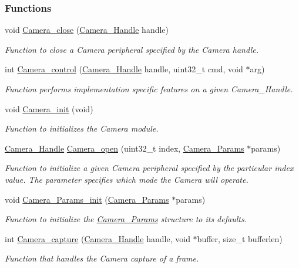 \subsubsection*{Functions}
\begin{DoxyCompactItemize}
\item 
void \hyperlink{_camera_8h_a132c638e5ea994c1f06124f5762470b4}{Camera\+\_\+close} (\hyperlink{_camera_8h_a68ce39c29bb7acaf6a7180bb6d6a7d06}{Camera\+\_\+\+Handle} handle)
\begin{DoxyCompactList}\small\item\em Function to close a Camera peripheral specified by the Camera handle. \end{DoxyCompactList}\item 
int \hyperlink{_camera_8h_adfc7e9a60daa499220296a238a09b393}{Camera\+\_\+control} (\hyperlink{_camera_8h_a68ce39c29bb7acaf6a7180bb6d6a7d06}{Camera\+\_\+\+Handle} handle, uint32\+\_\+t cmd, void $\ast$arg)
\begin{DoxyCompactList}\small\item\em Function performs implementation specific features on a given Camera\+\_\+\+Handle. \end{DoxyCompactList}\item 
void \hyperlink{_camera_8h_ab0208c74b70ac5b50cb26c36f1f3ebad}{Camera\+\_\+init} (void)
\begin{DoxyCompactList}\small\item\em Function to initializes the Camera module. \end{DoxyCompactList}\item 
\hyperlink{_camera_8h_a68ce39c29bb7acaf6a7180bb6d6a7d06}{Camera\+\_\+\+Handle} \hyperlink{_camera_8h_a5bd1f515c97e0f598ff554c663bc6cde}{Camera\+\_\+open} (uint32\+\_\+t index, \hyperlink{struct_camera___params}{Camera\+\_\+\+Params} $\ast$params)
\begin{DoxyCompactList}\small\item\em Function to initialize a given Camera peripheral specified by the particular index value. The parameter specifies which mode the Camera will operate. \end{DoxyCompactList}\item 
void \hyperlink{_camera_8h_a522620ae3e5fb202b1f46f5535619564}{Camera\+\_\+\+Params\+\_\+init} (\hyperlink{struct_camera___params}{Camera\+\_\+\+Params} $\ast$params)
\begin{DoxyCompactList}\small\item\em Function to initialize the \hyperlink{struct_camera___params}{Camera\+\_\+\+Params} structure to its defaults. \end{DoxyCompactList}\item 
int \hyperlink{_camera_8h_a972bd90e219313d8eca55626c4294c8e}{Camera\+\_\+capture} (\hyperlink{_camera_8h_a68ce39c29bb7acaf6a7180bb6d6a7d06}{Camera\+\_\+\+Handle} handle, void $\ast$buffer, size\+\_\+t bufferlen)
\begin{DoxyCompactList}\small\item\em Function that handles the Camera capture of a frame. \end{DoxyCompactList}\end{DoxyCompactItemize}


